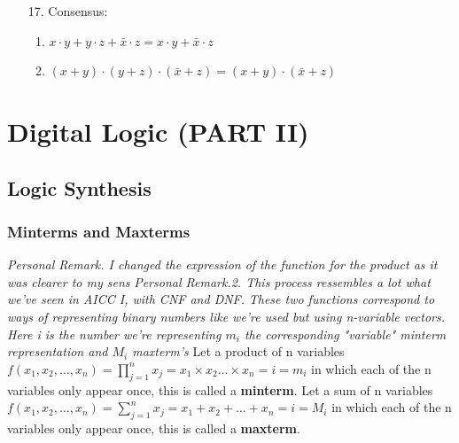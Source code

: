 \documentclass[12pt,openany, tikz,border=10pt]{book}
\begin{document}
\begin{multicols}{2}
\begin{enumerate}
\begin{enumerate}
			      			      \end{enumerate}
			      			\item[17.] Consensus:
			      			      \begin{enumerate}
			      			      	\item $x \cdot y + y \cdot z + \bar{x} \cdot z = x \cdot y + \bar{x} \cdot z$
			      			      	\item $(x + y) \cdot (y + z) \cdot (\bar{x} + z) = (x + y) \cdot (\bar{x} + z)$
			      			      \end{enumerate}
			      		\end{enumerate}
			      		        
			      	\end{multicols} %
			      	            
			      	        
			      	        
			      	\chapter{Digital Logic (PART II)}
			      	\section{Logic Synthesis}
			      	\subsection{Minterms and Maxterms}
			      	\textit{Personal Remark. I changed the expression of the function for the product as it was clearer to my sens} \newline
			      	\vspace{10px}
			      	\textit{Personal Remark.2. This process ressembles a lot what we've seen in AICC I, with CNF and DNF.} \newline
			      	\vspace{10px}
			      	\textit{These two functions correspond to ways of representing binary numbers like we're used but using n-variable vectors. Here i is the number we're representing $m_i$ the corresponding "variable" minterm representation and $M_i$ maxterm's}\newline
			      	\vspace{10px}
			      	Let a product of n variables $f(x_{1}, x_{2}, \ldots, x_{n}) = \prod_{j=1}^{n}x_{j} = x_{1} \times x_{2} \ldots \times x_n = i = m_i$ in which each of the n variables only appear once, this is called a \textbf{minterm}. \newline
			      	\vspace{5px}
			      	Let a sum of n variables $f(x_{1}, x_{2}, \ldots, x_{n}) = \sum_{j=1}^{n}x_{j} = x_{1} + x_{2} + \ldots + x_n = i = M_i$ in which each of the n variables only appear once, this is called a \textbf{maxterm}. \newline
			      	
\end{document}
